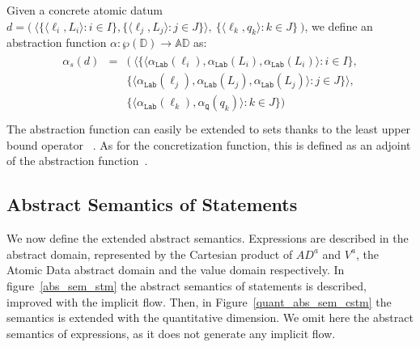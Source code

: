 \documentclass{llncs}
\newcommand{\blangle}{\big\langle}
\newcommand{\brangle}{\big\rangle}
\begin{document}
\begin{definition}\label{quant_abs_funct_ad}	
Given a concrete atomic datum $d=\big (\ \blangle\{\langle \ell_i, L_i\rangle : i \in I\}, \{\langle \ell_j, L_j\rangle : j \in J\}\brangle,\ \{\langle \ell_k, q_k \rangle:k\in J \}\ \big )$, we define an abstraction function $\alpha: \wp(\mathds{D}) \longrightarrow \mathds{AD}$ as:
\begin{align*}
\begin{array}{rcl}
\alpha_s(d) & = & \big (\ \blangle\{\langle \alpha_{\mathtt{Lab}}(\ell_i), \alpha_{\mathtt{Lab}}(L_i), \alpha_{\mathtt{Lab}}(L_i)\rangle: i \in I \},\\
& & \{\langle \alpha_{\mathtt{Lab}}(\ell_j), \alpha_{\mathtt{Lab}}(L_j), \alpha_{\mathtt{Lab}}(L_j)\rangle: j \in J \}\brangle ,\\
& & \{\langle \alpha_{\mathtt{Lab}}(\ell_k), \alpha_{\mathtt{Q}}(q_k)\rangle: k \in J \}\big )\\ 
\end{array}
\end{align*}
The abstraction function can easily be extended to sets thanks to the least upper bound operator 
~\cite{Cortesi15}. As for the concretization function, this is defined as an adjoint of the abstraction function~\cite{Cortesi15}.
\end{definition}

\subsection{Abstract Semantics of Statements}
We now define the extended abstract semantics. Expressions are described in the abstract domain, represented by the Cartesian product of $AD^a$ and $V^a$,  the Atomic Data abstract domain and the value domain respectively. In figure~\ref{abs_sem_stm} the abstract semantics of statements is described, improved with the implicit flow. Then, in 
Figure~\ref{quant_abs_sem_cstm} the semantics is extended with the quantitative dimension. We omit here the abstract semantics of expressions, as it does not generate any implicit flow.
\end{document}
